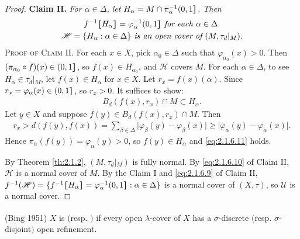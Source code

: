\documentclass[main.tex]{subfiles}
\begin{document}
\begin{proof}
\vspace{8pt}
\textbf{Claim II.} \textit{For $\alpha \in \Delta$, let $H_\alpha =M\cap \pi^{-1}_\alpha(0,1\hstretch{1.8}{]}$. Then}
\begin{gather}
f^{-1}\hstretch{1.8}{[}H_\alpha\hstretch{1.8}{]} = \varphi^{-1}_\alpha(0, 1\hstretch{1.8}{]} \textit{ for each } \alpha \in \Delta. \label{eq:2.1.6.9} \\
\mathscr{H} = \{H_\alpha: \alpha \in \Delta\} \textit{ is an open cover of }
	(M, \tau_d\vert{}_M).  \label{eq:2.1.6.10}
\end{gather}
\textsc{Proof of Claim II.}  For each $x \in X$, pick 
$\alpha_0 \in \Delta$ such that $\varphi_{\alpha_0}(x) > 0$. 
Then $(\pi_{\alpha_0} \circ f)(x) \in (0, 1\hstretch{1.8}{]}$, so $f(x) \in H_{\alpha_0}$, 
and $\mathscr{H}$ covers $M$. 
	For each $\alpha \in \Delta$,  to see $H_\alpha \in \tau_d\vert{}_M$, let $f(x) \in H_\alpha$
	for $x \in X$. Let $r_x = f(x)(\alpha)$.
	Since $r_x = \varphi_\alpha(x) \in (0, 1\hstretch{1.8}{]}$, so $r_x > 0$. It suffices to show:
\begin{gather}
		B_d(f(x), r_x) \cap M \subset H_\alpha. \label{eq:2.1.6.11} %
\end{gather}
Let $y \in X$ and suppose $f(y) \in B_d(f(x), r_x) \cap M$. Then
\begin{gather}
	r_x > d(f(y), f(x)) = \sum_{\beta \in \Delta} \vert{}\varphi_\beta(y) - \varphi_\beta(x)\vert{} \ge \vert{}\varphi_\alpha(y) - \varphi_\alpha(x)\vert{}. \label{eq:2.1.6.12}
\end{gather}
Hence $\pi_\alpha(f(y)) = \varphi_\alpha(y) > 0$, so $f(y) \in H_\alpha$ and \eqref{eq:2.1.6.11} holds.
	
By Theorem \ref{th:2.1.2}, $(M, \tau_d\vert{}_M)$ is fully normal. 
By \eqref{eq:2.1.6.10} of Claim II, $\mathscr{H}$ is 
	a normal cover of $M$. By the Claim I and  \eqref{eq:2.1.6.9} of Claim II, 
	$f^{-1}(\mathscr{H}) = \{f^{-1}\hstretch{1.8}{[}H_\alpha\hstretch{1.8}{]}= \varphi^{-1}_\alpha (0,1\hstretch{1.8}{]}: \alpha \in \Delta\}$ 
	is a normal cover of $(X, \tau)$, so $\mathscr{U}$ is a normal cover.
\end{proof} 

{ \label{def:2.1.7}
\textup{(\hstretch{1.8}{[}Bing 1951\hstretch{1.8}{]}\textsuperscript{\cite{Bing}})} $X$ is 
$($resp. $)$
if every open $\lambda$-cover of $X$ has a 
$\sigma$-discrete $($resp. $\sigma$-disjoint$)$ open refinement.
}
\end{document}
